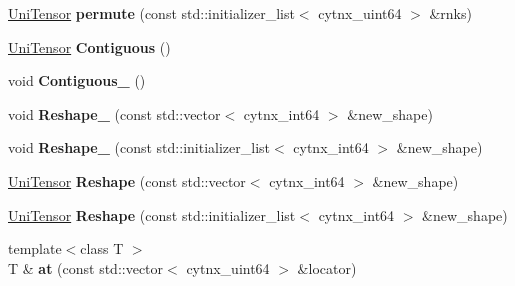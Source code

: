 \begin{DoxyCompactItemize}
\item 
\mbox{\label{classcytnx_1_1UniTensor_aacf879e6b64096131b123f30d0410420}} 
\hyperlink{classcytnx_1_1UniTensor}{Uni\+Tensor} {\bfseries permute} (const std\+::initializer\+\_\+list$<$ cytnx\+\_\+uint64 $>$ \&rnks)
\item 
\mbox{\label{classcytnx_1_1UniTensor_a568579dd1627065271e2705df9e66d51}} 
\hyperlink{classcytnx_1_1UniTensor}{Uni\+Tensor} {\bfseries Contiguous} ()
\item 
\mbox{\label{classcytnx_1_1UniTensor_af15d2e70d66bfad1e0292d8fa9436508}} 
void {\bfseries Contiguous\+\_\+} ()
\item 
\mbox{\label{classcytnx_1_1UniTensor_a914cb4b63628e9b8e428f6c6d655bd77}} 
void {\bfseries Reshape\+\_\+} (const std\+::vector$<$ cytnx\+\_\+int64 $>$ \&new\+\_\+shape)
\item 
\mbox{\label{classcytnx_1_1UniTensor_a960fff66270eed53bee8eddf40007d27}} 
void {\bfseries Reshape\+\_\+} (const std\+::initializer\+\_\+list$<$ cytnx\+\_\+int64 $>$ \&new\+\_\+shape)
\item 
\mbox{\label{classcytnx_1_1UniTensor_aa5f14ae6c7f9e515e904d30f065e1dc5}} 
\hyperlink{classcytnx_1_1UniTensor}{Uni\+Tensor} {\bfseries Reshape} (const std\+::vector$<$ cytnx\+\_\+int64 $>$ \&new\+\_\+shape)
\item 
\mbox{\label{classcytnx_1_1UniTensor_a0d47436cf7fe9f3e29ce1ba9711b1be0}} 
\hyperlink{classcytnx_1_1UniTensor}{Uni\+Tensor} {\bfseries Reshape} (const std\+::initializer\+\_\+list$<$ cytnx\+\_\+int64 $>$ \&new\+\_\+shape)
\item 
\mbox{\label{classcytnx_1_1UniTensor_a432b37f45cd8a87ceefd45eb2d8e6330}} 
{\footnotesize template$<$class T $>$ }\\T \& {\bfseries at} (const std\+::vector$<$ cytnx\+\_\+uint64 $>$ \&locator)
\item 
\mbox{\label{classcytnx_1_1UniTensor_acca30968768c6e59e552b7ea0f1dde00}} 

\end{DoxyCompactItemize}
